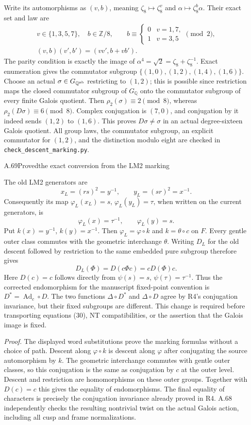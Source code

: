 Write its automorphisms as $(v,b)$, meaning
$\zeta_8\mapsto\zeta_8^v$ and
$\alpha\mapsto\zeta_8^b\alpha$. Their exact set and law are
\[
 \begin{gathered}
 v\in\{1,3,5,7\},\quad b\in\mathbb Z/8,\qquad
 b\equiv\begin{cases}0&v=1,7,\\1&v=3,5\end{cases}\pmod2,\\
 (v,b)(v',b')=(vv',b+vb').
 \end{gathered}
\]
The parity condition is exactly the image of
$\alpha^4=\sqrt2=\zeta_8+\zeta_8^{-1}$. Exact enumeration
gives the commutator subgroup $\{(1,0),(1,2),(1,4),(1,6)\}$.
Choose an actual $\sigma\in G_{\mathbb Q^{\rm ab}}$ restricting
to $(1,2)$; this is possible since restriction maps the closed
commutator subgroup of $G_{\mathbb Q}$ onto the commutator
subgroup of every finite Galois quotient. Then
$\rho_2(\sigma)\equiv2\pmod8$, whereas
$\rho_2(D\sigma)\equiv6\pmod8$. Complex conjugation is
$(7,0)$, and conjugation by it indeed sends $(1,2)$ to $(1,6)$.
This proves $D\sigma\ne\sigma$ in an actual degree-sixteen
Galois quotient. All group laws, the commutator subgroup, an
explicit commutator for $(1,2)$, and the distinction modulo eight
are checked in \texttt{check\_descent\_marking.py}.

\begin{statement}{A.69}{Proved}{the exact conversion from the LM2 marking}
\end{statement}
The old LM2 generators are
\[
 x_L=(rs)^2=y^{-1},\qquad y_L=(sr)^2=x^{-1}.
\]
Consequently its map $\varphi_L(x_L)=s$, $\varphi_L(y_L)=\tau$,
when written on the current generators, is
\[
 \varphi_L(x)=\tau^{-1},\qquad \varphi_L(y)=s.
\]
Put $k(x)=y^{-1}$, $k(y)=x^{-1}$. Then
$\varphi_L=\varphi\circ k$ and $k=\theta\circ c$ on $F$.
Every gentle outer class commutes with the geometric interchange
$\theta$. Writing $D_L$ for the old descent followed by restriction
to the same embedded pure subgroup therefore gives
\[
 D_L(\Phi)=D(c\Phi c)=cD(\Phi)c.
\]
Here $D(c)=c$ follows directly from
$\psi(s)=s$, $\psi(\tau)=\tau^{-1}$. Thus the corrected
endomorphism for the manuscript fixed-point convention is
$D^*=\operatorname{Ad}_c\circ D$. The two functions
$\Delta\circ D^*$ and $\Delta\circ D$ agree by R4's
conjugation invariance, but their fixed subgroups are different.
This change is required before transporting equations (30), NT
compatibilities, or the assertion that the Galois image is fixed.

\emph{Proof.}
The displayed word substitutions prove the marking formulas
without a choice of path. Descent along $\varphi\circ k$ is descent
along $\varphi$ after conjugating the source automorphism by $k$.
The geometric interchange commutes with gentle outer classes, so
this conjugation is the same as conjugation by $c$ at the outer
level. Descent and restriction are homomorphisms on these outer
groups. Together with $D(c)=c$ this gives the equality of
endomorphisms. The final equality of characters is precisely the
conjugation invariance already proved in R4. A.68 independently
checks the resulting nontrivial twist on the actual Galois action,
including all cusp and frame normalizations.

